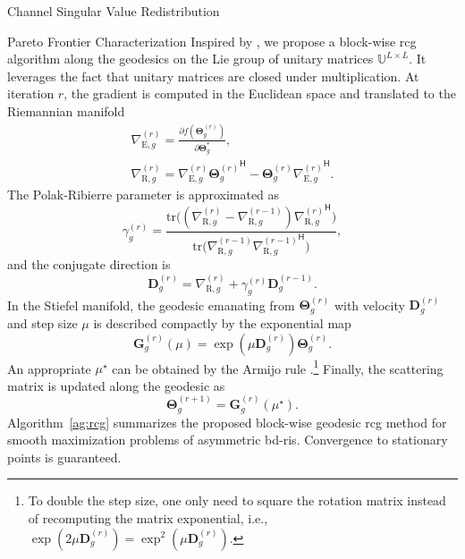 \documentclass[journal]{IEEEtran}
\begin{document}
\begin{section}{Channel Singular Value Redistribution}
\begin{subsection}{Pareto Frontier Characterization}
		Inspired by \cite{Abrudan2008,Abrudan2009}, we propose a block-wise \gls{rcg} algorithm along the geodesics on the Lie group of unitary matrices $\mathbb{U}^{L \times L}$.
		It leverages the fact that unitary matrices are closed under multiplication.
		At iteration $r$, the gradient is computed in the Euclidean space and translated to the Riemannian manifold \cite{Absil2009}
		\begin{gather}
			\nabla_{\mathrm{E},g}^{(r)} = \frac{\partial f(\mathbf{\Theta}_g^{(r)})}{\partial \mathbf{\Theta}_g^*},\label{eq:gradient_euclidean}\\
			\nabla_{\mathrm{R},g}^{(r)} = \nabla_{\mathrm{E},g}^{(r)} {\mathbf{\Theta}_g^{(r)}}^\mathsf{H} - \mathbf{\Theta}_g^{(r)} {\nabla_{\mathrm{E},g}^{(r)}}^\mathsf{H}.\label{eq:gradient_riemannian}
		\end{gather}
		The Polak-Ribierre parameter \cite{Polak1969} is approximated as \cite{Abrudan2009}
		\begin{equation}
			\gamma_g^{(r)} = \frac{\mathrm{tr}\bigl((\nabla_{\mathrm{R},g}^{(r)} - \nabla_{\mathrm{R},g}^{(r-1)}) {\nabla_{\mathrm{R},g}^{(r)}}^\mathsf{H}\bigr)}{\mathrm{tr}\bigl(\nabla_{\mathrm{R},g}^{(r-1)} {\nabla_{\mathrm{R},g}^{(r-1)}}^\mathsf{H}\bigr)},
			\label{eq:parameter_cg}
		\end{equation}
		and the conjugate direction is
		\begin{equation}
			\mathbf{D}_g^{(r)} = \nabla_{\mathrm{R},g}^{(r)} + \gamma_g^{(r)} \mathbf{D}_g^{(r-1)}.
			\label{eq:direction_cg}
		\end{equation}
		In the Stiefel manifold, the geodesic emanating from $\mathbf{\Theta}_g^{(r)}$ with velocity $\mathbf{D}_g^{(r)}$ and step size $\mu$ is described compactly by the exponential map \cite{Edelman1998}
		\begin{equation}
			\mathbf{G}_g^{(r)}(\mu) = \exp(\mu \mathbf{D}_g^{(r)}) \mathbf{\Theta}_g^{(r)}.
			\label{eq:geodesic}
		\end{equation}
		An appropriate $\mu^\star$ can be obtained by the Armijo rule \cite{Armijo1966}.\footnote{To double the step size, one only need to square the rotation matrix instead of recomputing the matrix exponential, i.e., $\exp(2 \mu \mathbf{D}_g^{(r)}) = \exp^2(\mu \mathbf{D}_g^{(r)})$.}
		Finally, the scattering matrix is updated along the geodesic as
		\begin{equation}
			\mathbf{\Theta}_g^{(r+1)} = \mathbf{G}_g^{(r)}(\mu^\star).
			\label{eq:update_geodesic}
		\end{equation}
		Algorithm~\ref{ag:rcg} summarizes the proposed block-wise geodesic \gls{rcg} method for smooth maximization problems of asymmetric \gls{bd}-\gls{ris}.
		Convergence to stationary points is guaranteed.


\end{subsection}
\end{section}
\end{document}
